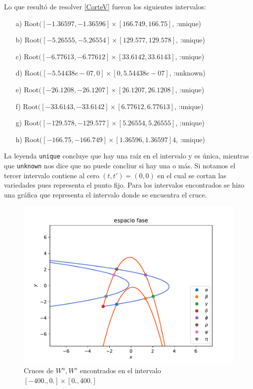 Lo que resultó de resolver \ref{CorteV} fueron los siguientes intervalos:
\begin{itemize}
\item[a)] Root$([-1.36597, -1.36596] \times [166.749, 166.75]$, :unique)
\item[b)] Root$([-5.26555, -5.26554] \times [129.577, 129.578]$, :unique)
\item[c)] Root$([-6.77613, -6.77612] \times [33.6142, 33.6143]$, :unique)
\item[d)] Root$([-5.54438e-07, 0] \times [0, 5.54438e-07]$, :unknown)     
\item[e)] Root$([-26.1208, -26.1207] \times [26.1207, 26.1208]$, :unique)  
\item[f)] Root$([-33.6143, -33.6142] \times [6.77612, 6.77613]$, :unique)  
\item[g)] Root$([-129.578, -129.577] \times [5.26554, 5.26555]$, :unique) 
\item[h)] Root$([-166.75, -166.749] \times [1.36596, 1.36597]4$, :unique)
\end{itemize}

La leyenda \texttt{unique} concluye que hay una raíz en el intervalo y es única, mientras que \texttt{unknown} nos dice que no puede concliur si hay una o más. Si notamos el tercer intervalo contiene al cero $(t,t')=(0,0)$ en el cual se cortan las variedades pues representa el punto fijo. Para los intervalos encontrados se hizo una gráfica que representa el intervalo donde se encuentra el cruce. 


\begin{figure}[H]
\centering
\includegraphics[scale=0.5]{crucesL}
\caption{Cruces de $W^{u},W^{s}$ encontrados en el intervalo $[-400.,0.] \times [0.,400.]$ }
\label{cruces}
\end{figure}


